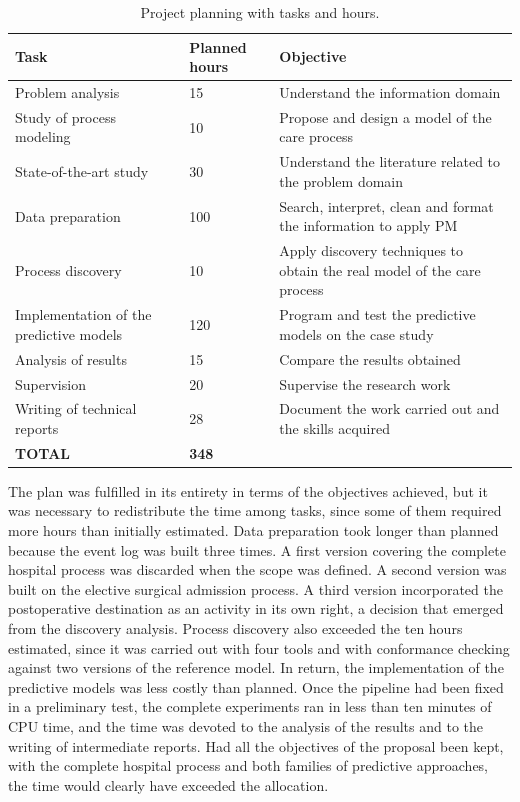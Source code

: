 \begin{table}[htbp]
\centering
\caption{Project planning with tasks and hours.}
\label{tab:planificacion}
\begin{tabular}{L{5.2cm}C{1.8cm}L{6.6cm}}
\toprule
Task & Planned hours & Objective \\
\midrule
Problem analysis & 15 & Understand the information domain \\
Study of process modeling & 10 & Propose and design a model of the care process \\
State-of-the-art study & 30 & Understand the literature related to the problem domain \\
Data preparation & 100 & Search, interpret, clean and format the information to apply PM \\
Process discovery & 10 & Apply discovery techniques to obtain the real model of the care process \\
Implementation of the predictive models & 120 & Program and test the predictive models on the case study \\
Analysis of results & 15 & Compare the results obtained \\
Supervision & 20 & Supervise the research work \\
Writing of technical reports & 28 & Document the work carried out and the skills acquired \\
\midrule
\textbf{TOTAL} & \textbf{348} & \\
\bottomrule
\end{tabular}
\end{table}

The plan was fulfilled in its entirety in terms of the objectives achieved, but it was necessary to redistribute the time among tasks, since some of them required more hours than initially estimated. Data preparation took longer than planned because the event log was built three times. A first version covering the complete hospital process was discarded when the scope was defined. A second version was built on the elective surgical admission process. A third version incorporated the postoperative destination as an activity in its own right, a decision that emerged from the discovery analysis. Process discovery also exceeded the ten hours estimated, since it was carried out with four tools and with conformance checking against two versions of the reference model. In return, the implementation of the predictive models was less costly than planned. Once the pipeline had been fixed in a preliminary test, the complete experiments ran in less than ten minutes of CPU time, and the time was devoted to the analysis of the results and to the writing of intermediate reports. Had all the objectives of the proposal been kept, with the complete hospital process and both families of predictive approaches, the time would clearly have exceeded the allocation.

